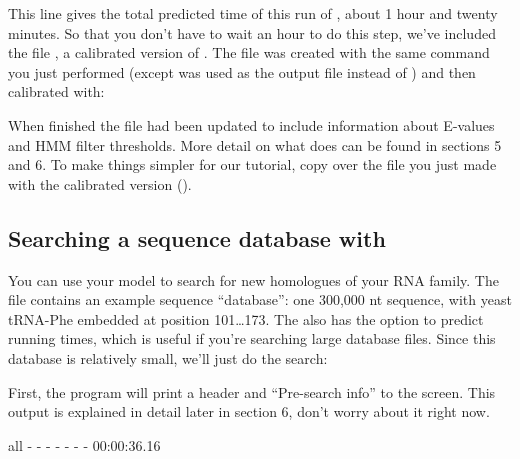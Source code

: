 This line gives the total predicted time of this run of
, about 1 hour and twenty minutes. So that you
don't have to wait an hour to do this step, we've included the file
, a calibrated version of . The
 file was created with the same  command
you just performed (except  was used as the output file
instead of ) and then calibrated with:


When  finished the  file had
been updated to include information about E-values and HMM filter
thresholds. More detail on what  does can be found
in sections 5 and 6. To make things simpler for our tutorial, copy over
the  file you just made with the calibrated version 
().

\subsection{Searching a sequence database with }

You can use your model to search for new homologues of your RNA
family. The file  contains an example sequence
``database'': one 300,000 nt sequence, with yeast tRNA-Phe embedded at
position 101\ldots173. The  also has the
 option to predict running times, which is useful if
you're searching large database files. Since this database is
relatively small, we'll just do the search:


First, the program will print a header and ``Pre-search info'' to the
screen. This output is explained in detail later in section 6, don't
worry about it right now. 

\begin{sreoutput}
  all    -    -    -      -           -        -        -  00:00:36.16
\end{sreoutput}

